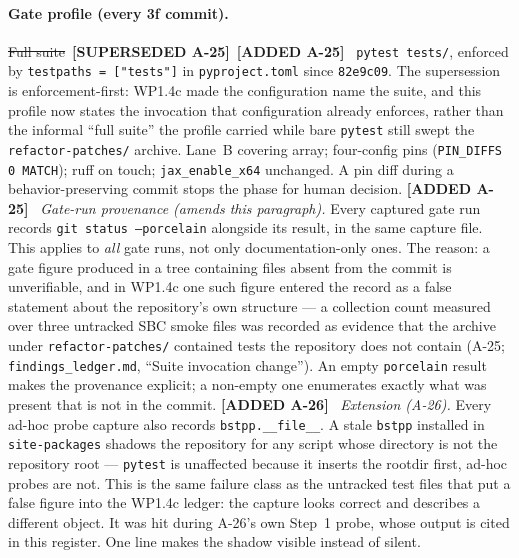 \documentclass[
  10pt,
]{article}
\newcommand{\amdstrike}[1]{\sout{#1}}
\newcommand{\amdstrike}[1]{\textcolor{supcolor}{#1}}
\newcommand{\amdnew}[1]{{\color{amdcolor}\footnotesize\textbf{[ADDED #1]}}\ }
\newcommand{\supsd}[2]{{\color{supcolor}\amdstrike{#2}}~{\color{amdcolor}\footnotesize\textbf{[SUPERSEDED #1]}}}
\begin{document}
\paragraph{Gate profile (every 3f commit).}
\supsd{A-25}{Full suite}\ \amdnew{A-25} \texttt{pytest tests/}, enforced by \texttt{testpaths = ["tests"]} in \texttt{pyproject.toml} since \texttt{82e9c09}. The supersession is enforcement-first: WP1.4c made the configuration name the suite, and this profile now states the invocation that configuration already enforces, rather than the informal ``full suite'' the profile carried while bare \texttt{pytest} still swept the \texttt{refactor-patches/} archive. Lane~B covering array; four-config pins (\texttt{PIN\_DIFFS 0 MATCH}); ruff on touch; \texttt{jax\_enable\_x64} unchanged. A pin diff during a behavior-preserving commit stops the phase for human decision.
\amdnew{A-25} \emph{Gate-run provenance (amends this paragraph).} Every captured gate run records \texttt{git status --porcelain} alongside its result, in the same capture file. This applies to \emph{all} gate runs, not only documentation-only ones. The reason: a gate figure produced in a tree containing files absent from the commit is unverifiable, and in WP1.4c one such figure entered the record as a false statement about the repository's own structure --- a collection count measured over three untracked SBC smoke files was recorded as evidence that the archive under \texttt{refactor-patches/} contained tests the repository does not contain (A-25; \texttt{findings\_ledger.md}, ``Suite invocation change''). An empty \texttt{porcelain} result makes the provenance explicit; a non-empty one enumerates exactly what was present that is not in the commit.
\amdnew{A-26} \emph{Extension (A-26).} Every ad-hoc probe capture also records \texttt{bstpp.\_\_file\_\_}. A stale \texttt{bstpp} installed in \texttt{site-packages} shadows the repository for any script whose directory is not the repository root --- \texttt{pytest} is unaffected because it inserts the rootdir first, ad-hoc probes are not. This is the same failure class as the untracked test files that put a false figure into the WP1.4c ledger: the capture looks correct and describes a different object. It was hit during A-26's own Step~1 probe, whose output is cited in this register. One line makes the shadow visible instead of silent.
\end{document}
